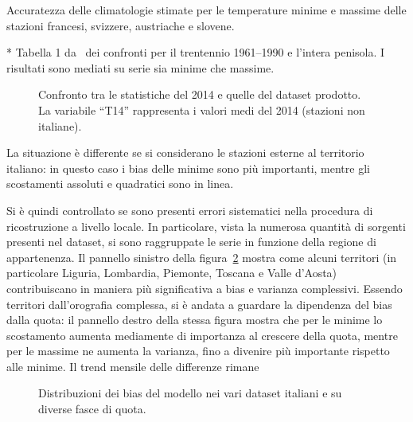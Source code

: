 \begin{table}[ht]
  \centering
  \begin{threeparttable}
    \caption{Accuratezza delle climatologie stimate per le temperature minime e massime delle stazioni francesi, svizzere, austriache e slovene.}\label{tab:bias-non-ita}
    
    \begin{tablenotes}
    \item[*] Tabella 1 da~\cite[p.~10]{brunettiHighresolutionTemperatureClimatology2014} dei confronti per il trentennio 1961--1990 e l'intera penisola. I risultati sono mediati su serie sia minime che massime.
    \end{tablenotes}
  \end{threeparttable}
\end{table}

\begin{figure}
  \centering
  
  \caption{Confronto tra le statistiche del 2014 e quelle del dataset prodotto. La variabile ``T14'' rappresenta i valori medi del 2014 (stazioni non italiane).}\label{fig:diffs-mese-nonita}
\end{figure}
La situazione è differente se si considerano le stazioni esterne al territorio italiano: in questo caso i bias delle minime sono più importanti, mentre gli scostamenti assoluti e quadratici sono in linea.

Si è quindi controllato se sono presenti errori sistematici nella procedura di ricostruzione a livello locale. In particolare, vista la numerosa quantità di sorgenti presenti nel dataset, si sono raggruppate le serie in funzione della regione di appartenenza. Il pannello sinistro della figura~\ref{fig:boxplots-ita} mostra come alcuni territori (in particolare Liguria, Lombardia, Piemonte, Toscana e Valle d'Aosta) contribuiscano in maniera più significativa a bias e varianza complessivi. Essendo territori dall'orografia complessa, si è andata a guardare la dipendenza del bias dalla quota: il pannello destro della stessa figura mostra che per le minime lo scostamento aumenta mediamente di importanza al crescere della quota, mentre per le massime ne aumenta la varianza, fino a divenire più importante rispetto alle minime. Il trend mensile delle differenze rimane

\begin{figure}[ht]
  \centering
  
  \caption{Distribuzioni dei bias del modello nei vari dataset italiani e su diverse fasce di quota.}\label{fig:boxplots-ita}
\end{figure}

